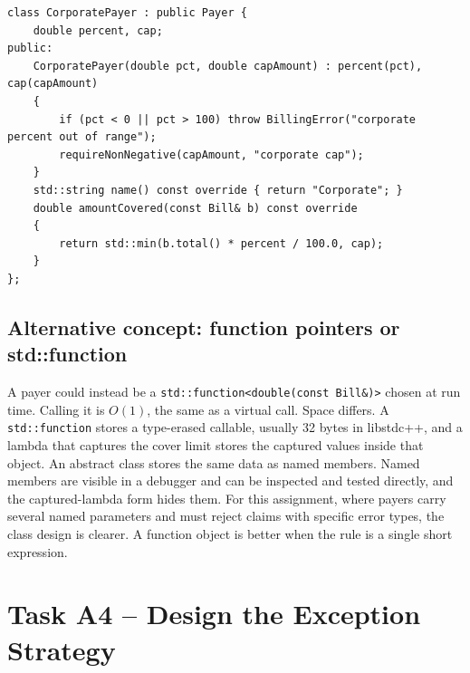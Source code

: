 \documentclass[11pt,a4paper]{article}
\begin{document}
\begin{lstlisting}[caption={extension.hpp: CorporatePayer (new payer, no existing class changed)}]
class CorporatePayer : public Payer {
    double percent, cap;
public:
    CorporatePayer(double pct, double capAmount) : percent(pct), cap(capAmount)
    {
        if (pct < 0 || pct > 100) throw BillingError("corporate percent out of range");
        requireNonNegative(capAmount, "corporate cap");
    }
    std::string name() const override { return "Corporate"; }
    double amountCovered(const Bill& b) const override
    {
        return std::min(b.total() * percent / 100.0, cap);
    }
};
\end{lstlisting}

\subsection*{Alternative concept: function pointers or std::function}
A payer could instead be a \texttt{std::function<double(const Bill\&)>} chosen at run time. Calling it is $O(1)$, the same as a virtual call. Space differs. A \texttt{std::function} stores a type-erased callable, usually 32 bytes in libstdc++, and a lambda that captures the cover limit stores the captured values inside that object. An abstract class stores the same data as named members. Named members are visible in a debugger and can be inspected and tested directly, and the captured-lambda form hides them. For this assignment, where payers carry several named parameters and must reject claims with specific error types, the class design is clearer. A function object is better when the rule is a single short expression.

\section{Task A4 -- Design the Exception Strategy}
\end{document}

